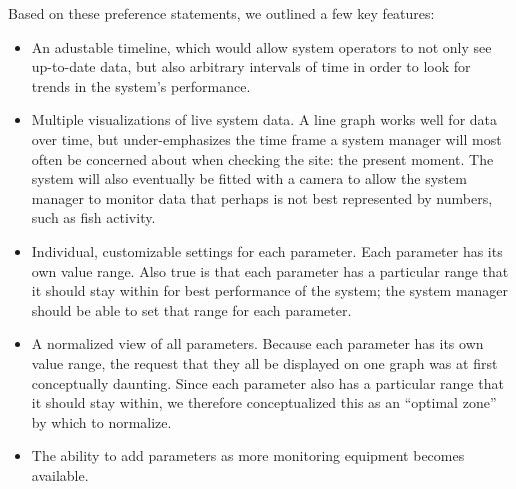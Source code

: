 \documentclass{sigchi}
\begin{document}
Based on these preference statements, we outlined a few key features:
\begin{itemize}
\item An adustable timeline, which would allow system operators to not only see up-to-date data, but also arbitrary intervals of time in order to look for trends in the system's performance. 
\item Multiple visualizations of live system data. A line graph works well for data over time, but under-emphasizes the time frame a system manager will most often be concerned about when checking the site: the present moment. The system will also eventually be fitted with a camera to allow the system manager to monitor data that perhaps is not best represented by numbers, such as fish activity. 
\item Individual, customizable settings for each parameter. Each parameter has its own value range. Also true is that each parameter has a particular range that it should stay within for best performance of the system; the system manager should be able to set that range for each parameter. 
\item A normalized view of all parameters. Because each parameter has its own value range, the request that they all be displayed on one graph was at first conceptually daunting. Since each parameter also has a particular range that it should stay within, we therefore conceptualized this as an ``optimal zone'' by which to normalize. 
\item The ability to add parameters as more monitoring equipment becomes available. 
\end{itemize}
\end{document}
